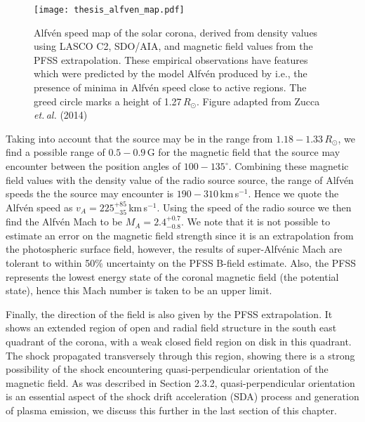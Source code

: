 %
%
%
\begin{figure}[t!]
\begin{center}
\texttt{[image: thesis\_alfven\_map.pdf]}
\caption[Alfv\'{e}n speed map of the solar corona.]{Alfv\'{e}n speed map of the solar corona, derived from density values using LASCO C2, SDO/AIA, and magnetic field values from the PFSS extrapolation. These empirical observations have features which were predicted by the model Alfv\'{e}n produced by \citet{warmuth2005} i.e., the presence of minima in Alfv\'{e}n speed close to active regions. The greed circle marks a height of 1.27\,$R_{\odot}$. Figure adapted from Zucca\,{\it et.\,al.} (2014)}
\label{fig:alfven_map}
\end{center}
\end{figure}
%
%
%
Taking into account that the source may be in the range from $1.18-1.33\,R_{\odot}$, we find a possible range of $0.5-0.9$\,G for the magnetic field that the source may encounter between the position angles of $100-135^{\circ}$. Combining these magnetic field values with the density value of the radio source source, the range of Alfv\'{e}n speeds the the source may encounter is $190-310$\,km\,s$^{-1}$. Hence we quote the Alfv\'{e}n speed as $v_A=225^{+85}_{-35}$\,km\,s$^{-1}$. Using the speed of the radio source we then find the Alfv\'{e}n Mach to be $M_A =2.4^{+0.7}_{-0.8}$. We note that it is not possible to estimate an error on the magnetic field strength since it is an extrapolation from the photospheric surface field, however, the results of super-Alfv\'{e}nic Mach are tolerant to within 50\% uncertainty on the PFSS B-field estimate. Also, the PFSS represents the lowest energy state of the coronal magnetic field (the potential state), hence this Mach number is taken to be an upper limit.

Finally, the direction of the field is also given by the PFSS extrapolation. It shows an extended region of open and radial field structure in the south east quadrant of the corona, with a weak closed field region on disk in this quadrant. The shock propagated transversely through this region, showing there is a strong possibility of the shock encountering quasi-perpendicular orientation of the magnetic field. As was described in Section 2.3.2, quasi-perpendicular orientation is an essential aspect of the shock drift acceleration (SDA) process and generation of plasma emission, we discuss this further in the last section of this chapter.


